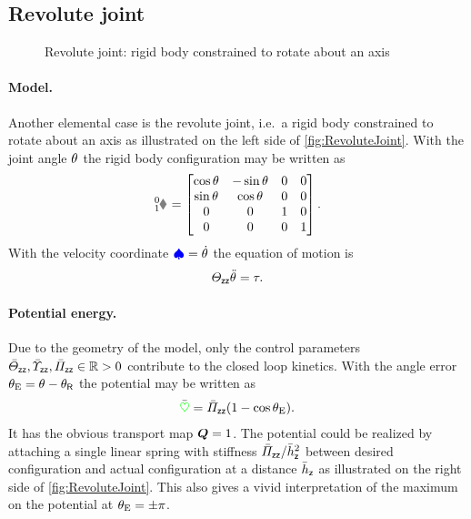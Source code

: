 \subsection{Revolute joint}\label{sec:CtrlExampleRevoluteJoint}
\begin{figure}
 \centering
 
 \caption{Revolute joint: rigid body constrained to rotate about an axis}
 \label{fig:RevoluteJoint}
\end{figure}

\paragraph{Model.}
Another elemental case is the revolute joint, i.e.\ a rigid body constrained to rotate about an axis as illustrated on the left side of \autoref{fig:RevoluteJoint}.
With the joint angle $\theta_{}$ the rigid body configuration may be written as
\begin{align}
 \bodyHomoCoord{0}{1} = \begin{bmatrix} \cos\jointAngle & -\sin\jointAngle & 0 & 0 \\ \sin\jointAngle & \cos\jointAngle & 0 & 0 \\ 0 & 0 & 1 & 0 \\ 0 & 0 & 0 & 1\end{bmatrix}.
\end{align}
With the velocity coordinate $\boldsymbol{\textcolor{blue}{\spadesuit}} = \dot{\theta}_{}$ the equation of motion is
\begin{align}\label{eq:RevoluteJointModel}
 \varTheta_{\mathsf{z}\mathsf{z}} \ddot{\theta}_{} = \tau.
\end{align}

\paragraph{Potential energy.}
Due to the geometry of the model, only the control parameters $\bar{\varTheta}_{\mathsf{z}\mathsf{z}}, \bar{\varUpsilon}_{\mathsf{z}\mathsf{z}}, \bar{\varPi}_{\mathsf{z}\mathsf{z}} \in \mathbb{R} > 0$ contribute to the closed loop kinetics.
With the angle error $\theta_{\mathrm{E}} = \theta_{} - \theta_{\mathsf{R}}$ the potential may be written as
\begin{align}
 \bar{\textcolor{green}{\heartsuit}} = \bar{\varPi}_{\mathsf{z}\mathsf{z}} (1 - \cos\theta_{\mathrm{E}}).
\end{align}
It has the obvious transport map $\boldsymbol{Q} = 1$.
The potential could be realized by attaching a single linear spring with stiffness $\bar{\varPi}_{\mathsf{z}\mathsf{z}} / \bar{h}_{\mathsf{z}}^2$ between desired configuration and actual configuration at a distance $\bar{h}_{\mathsf{z}}$ as illustrated on the right side of \autoref{fig:RevoluteJoint}.
This also gives a vivid interpretation of the maximum on the potential at $\theta_{\mathrm{E}} = \pm\pi$.

